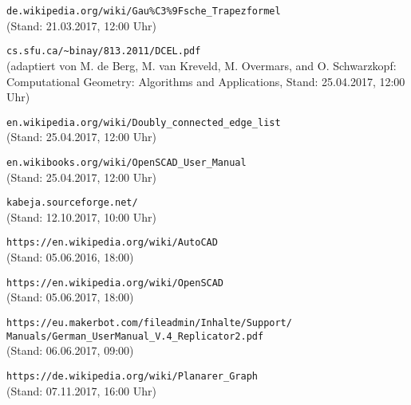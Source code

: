 \begin{thebibliography}{9}
		\verb|de.wikipedia.org/wiki/Gau%C3%9Fsche_Trapezformel| \\ (Stand: 21.03.2017, 12:00 Uhr)
		
		 \verb|cs.sfu.ca/~binay/813.2011/DCEL.pdf| \\ (adaptiert von M. de Berg, M. van Kreveld, M. Overmars, and O. Schwarzkopf: Computational Geometry: Algorithms and Applications, Stand: 25.04.2017, 12:00 Uhr)

		 \verb|en.wikipedia.org/wiki/Doubly_connected_edge_list| \\ (Stand: 25.04.2017, 12:00 Uhr)
		
		 \verb|en.wikibooks.org/wiki/OpenSCAD_User_Manual| \\ (Stand: 25.04.2017, 12:00 Uhr)
		
		 \verb|kabeja.sourceforge.net/| \\ (Stand: 12.10.2017, 10:00 Uhr)
		
		 
		 \verb|https://en.wikipedia.org/wiki/AutoCAD| \\ (Stand: 05.06.2016, 18:00)
		 
		 \verb|https://en.wikipedia.org/wiki/OpenSCAD| \\ (Stand: 05.06.2017, 18:00)
		 
		\verb|https://eu.makerbot.com/fileadmin/Inhalte/Support/| \\
		\tab \verb|Manuals/German_UserManual_V.4_Replicator2.pdf| \\ (Stand: 06.06.2017, 09:00)
	
		\verb|https://de.wikipedia.org/wiki/Planarer_Graph| \\ (Stand: 07.11.2017, 16:00 Uhr)
	
\end{thebibliography}